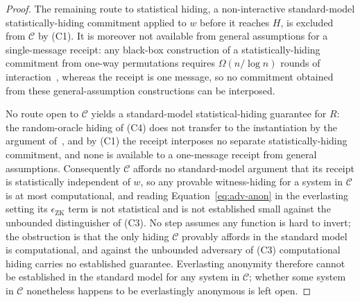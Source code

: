 \begin{proof}
    The remaining route to statistical hiding, a non-interactive standard-model statistically-hiding commitment applied to $w$ before it reaches $H$, is excluded from $\mathcal C$ by (C1). It is moreover not available from general assumptions for a single-message receipt: any black-box construction of a statistically-hiding commitment from one-way permutations requires $\Omega(n/\log n)$ rounds of interaction~\cite{hhrs2007,wee2007tcc}, whereas the receipt is one message, so no commitment obtained from these general-assumption constructions can be interposed.
    
    No route open to $\mathcal C$ yields a standard-model statistical-hiding guarantee for $R$: the random-oracle hiding of (C4) does not transfer to the instantiation by the argument of~\cite{cgh2004rom}, and by (C1) the receipt interposes no separate statistically-hiding commitment, and none is available to a one-message receipt from general assumptions. Consequently $\mathcal C$ affords no standard-model argument that its receipt is statistically independent of $w$, so any provable witness-hiding for a system in $\mathcal C$ is at most computational, and reading Equation~\eqref{eq:adv-anon} in the everlasting setting its $\epsilon_{\mathrm{ZK}}$ term is not statistical and is not established small against the unbounded distinguisher of (C3). No step assumes any function is hard to invert; the obstruction is that the only hiding $\mathcal C$ provably affords in the standard model is computational, and against the unbounded adversary of (C3) computational hiding carries no established guarantee. Everlasting anonymity therefore cannot be established in the standard model for any system in $\mathcal C$; whether some system in $\mathcal C$ nonetheless happens to be everlastingly anonymous is left open.
\end{proof}

